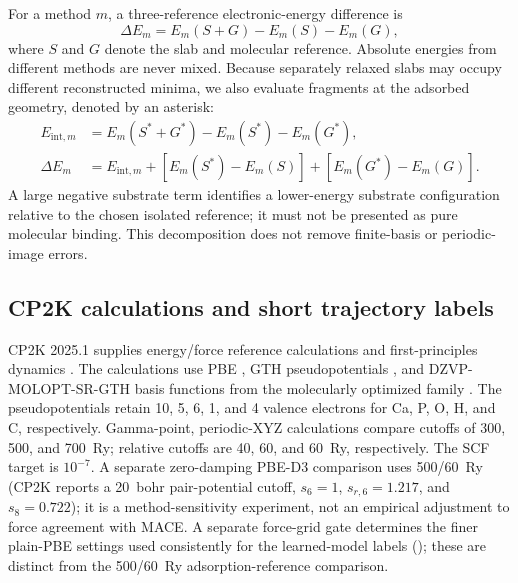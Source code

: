 \documentclass[11pt,a4paper]{article}
\begin{document}
For a method $m$, a three-reference electronic-energy difference is
\begin{equation}
 \Delta E_m=E_m(S+G)-E_m(S)-E_m(G),
\end{equation}
where $S$ and $G$ denote the slab and molecular reference. Absolute energies from different methods are never mixed. Because separately relaxed slabs may occupy different reconstructed minima, we also evaluate fragments at the adsorbed geometry, denoted by an asterisk:
\begin{align}
 E_{\mathrm{int},m}&=E_m(S^*+G^*)-E_m(S^*)-E_m(G^*),\\
 \Delta E_m&=E_{\mathrm{int},m}+[E_m(S^*)-E_m(S)]+[E_m(G^*)-E_m(G)].
\end{align}
A large negative substrate term identifies a lower-energy substrate configuration relative to the chosen isolated reference; it must not be presented as pure molecular binding. This decomposition does not remove finite-basis or periodic-image errors.

\subsection{CP2K calculations and short trajectory labels}
CP2K 2025.1 supplies energy/force reference calculations and first-principles dynamics \citep{Kuhne2020CP2K}. The calculations use PBE \citep{PBE1996}, GTH pseudopotentials \citep{GTH1996}, and DZVP-MOLOPT-SR-GTH basis functions from the molecularly optimized family \citep{MOLOPT2007}. The pseudopotentials retain 10, 5, 6, 1, and 4 valence electrons for Ca, P, O, H, and C, respectively. Gamma-point, periodic-XYZ calculations compare cutoffs of 300, 500, and 700~Ry; relative cutoffs are 40, 60, and 60~Ry, respectively. The SCF target is $10^{-7}$. A separate zero-damping PBE-D3 comparison \citep{D32010} uses 500/60~Ry (CP2K reports a 20~bohr pair-potential cutoff, $s_6=1$, $s_{r,6}=1.217$, and $s_8=0.722$); it is a method-sensitivity experiment, not an empirical adjustment to force agreement with MACE. A separate force-grid gate determines the finer plain-PBE settings used consistently for the learned-model labels (\LabelSettings); these are distinct from the 500/60~Ry adsorption-reference comparison.
\end{document}
